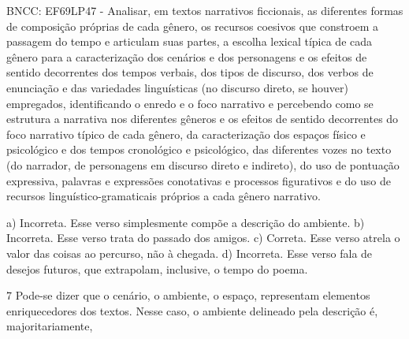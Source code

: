 \begin{escolha}
\begin{escolha}
BNCC: EF69LP47 - Analisar, em textos narrativos ficcionais, as
diferentes formas de composição próprias de cada gênero, os recursos
coesivos que constroem a passagem do tempo e articulam suas partes, a
escolha lexical típica de cada gênero para a caracterização dos cenários
e dos personagens e os efeitos de sentido decorrentes dos tempos
verbais, dos tipos de discurso, dos verbos de enunciação e das
variedades linguísticas (no discurso direto, se houver) empregados,
identificando o enredo e o foco narrativo e percebendo como se estrutura
a narrativa nos diferentes gêneros e os efeitos de sentido decorrentes
do foco narrativo típico de cada gênero, da caracterização dos espaços
físico e psicológico e dos tempos cronológico e psicológico, das
diferentes vozes no texto (do narrador, de personagens em discurso
direto e indireto), do uso de pontuação expressiva, palavras e
expressões conotativas e processos figurativos e do uso de recursos
linguístico-gramaticais próprios a cada gênero narrativo.

a) Incorreta. Esse verso simplesmente compõe a descrição do ambiente. b)
Incorreta. Esse verso trata do passado dos amigos. c) Correta. Esse
verso atrela o valor das coisas ao percurso, não à chegada. d)
Incorreta. Esse verso fala de desejos futuros, que extrapolam,
inclusive, o tempo do poema.

\num{7} Pode-se dizer que o cenário, o ambiente, o espaço, representam
elementos enriquecedores dos textos. Nesse caso, o ambiente delineado
pela descrição é, majoritariamente,

\end{escolha}
\end{escolha}
